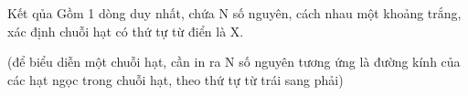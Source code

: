 Kết qủa
Gồm 1 dòng duy nhất, chứa N số nguyên, cách nhau một khoảng trắng, xác định chuỗi hạt có thứ tự từ điển là X.  

   (để biểu diễn một chuỗi hạt, cần in ra N số nguyên tương ứng là đường kính của các hạt ngọc trong chuỗi hạt, theo thứ tự từ trái sang phải)